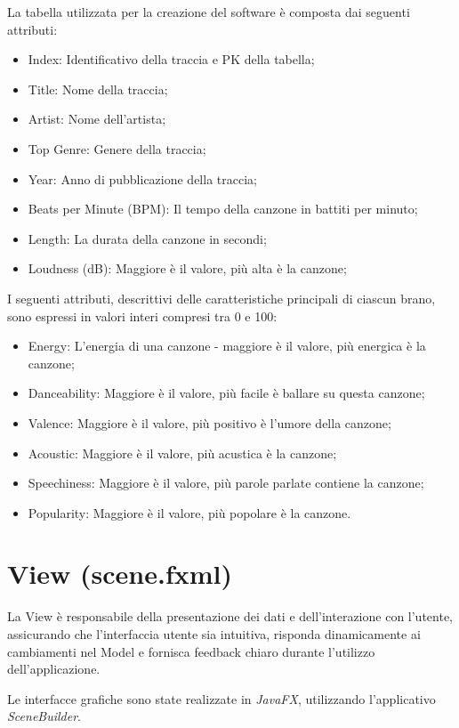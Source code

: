 \documentclass[12pt, a4paper]{article}
\begin{document}
La tabella utilizzata per la creazione del software è composta dai seguenti attributi:
\begin{itemize}
\item Index: Identificativo della traccia e PK della tabella;
\item Title: Nome della traccia;
\item Artist: Nome dell'artista;
\item Top Genre: Genere della traccia;
\item Year: Anno di pubblicazione della traccia;
\item Beats per Minute (BPM): Il tempo della canzone in battiti per minuto;
\item Length: La durata della canzone in secondi;
\item Loudness (dB): Maggiore è il valore, più alta è la canzone;
\end{itemize}
I seguenti attributi, descrittivi delle caratteristiche principali di ciascun brano, sono espressi in valori interi compresi tra 0 e 100:
\begin{itemize}
\item Energy: L'energia di una canzone - maggiore è il valore, più energica è la canzone;
\item Danceability: Maggiore è il valore, più facile è ballare su questa canzone;
\item Valence: Maggiore è il valore, più positivo è l'umore della canzone;
\item Acoustic: Maggiore è il valore, più acustica è la canzone;
\item Speechiness: Maggiore è il valore, più parole parlate contiene la canzone;
\item Popularity: Maggiore è il valore, più popolare è la canzone.
\end{itemize}

\newpage
\section{View (scene.fxml)}

La View è responsabile della presentazione dei dati e dell'interazione con l'utente, assicurando che l'interfaccia utente sia intuitiva, risponda dinamicamente ai cambiamenti nel Model e fornisca feedback chiaro durante l'utilizzo dell'applicazione.

Le interfacce grafiche sono state realizzate in \textit{JavaFX}, utilizzando l’applicativo \newline \textit{SceneBuilder}. 
\end{document}
